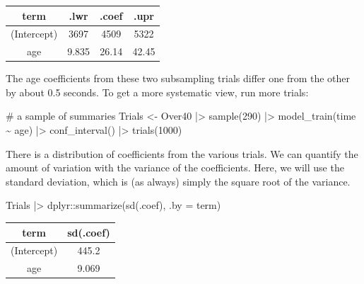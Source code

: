 \documentclass[
  letterpaper,
  DIV=11,
  numbers=noendperiod,
  oneside]{scrartcl}
\newenvironment{Shaded}{\begin{snugshade}}{\end{snugshade}}
\newcommand{\AttributeTok}[1]{\textcolor[rgb]{0.40,0.45,0.13}{#1}}
\newcommand{\CommentTok}[1]{\textcolor[rgb]{0.37,0.37,0.37}{#1}}
\newcommand{\DecValTok}[1]{\textcolor[rgb]{0.68,0.00,0.00}{#1}}
\newcommand{\FunctionTok}[1]{\textcolor[rgb]{0.28,0.35,0.67}{#1}}
\newcommand{\NormalTok}[1]{\textcolor[rgb]{0.00,0.23,0.31}{#1}}
\newcommand{\OtherTok}[1]{\textcolor[rgb]{0.00,0.23,0.31}{#1}}
\newcommand{\SpecialCharTok}[1]{\textcolor[rgb]{0.37,0.37,0.37}{#1}}
\begin{document}
\begin{longtable}[]{@{}cccc@{}}
\toprule\noalign{}
term & .lwr & .coef & .upr \\
\midrule\noalign{}
\endhead
\bottomrule\noalign{}
\endlastfoot
(Intercept) & 3697 & 4509 & 5322 \\
age & 9.835 & 26.14 & 42.45 \\
\end{longtable}

The age coefficients from these two subsampling trials differ one from
the other by about 0.5 seconds. To get a more systematic view, run more
trials:

\begin{Shaded}
\begin{Highlighting}[]
\CommentTok{\# a sample of summaries}
\NormalTok{Trials }\OtherTok{\textless{}{-}} 
\NormalTok{  Over40 }\SpecialCharTok{|\textgreater{}} \FunctionTok{sample}\NormalTok{(}\DecValTok{290}\NormalTok{) }\SpecialCharTok{|\textgreater{}}
  \FunctionTok{model\_train}\NormalTok{(time }\SpecialCharTok{\textasciitilde{}}\NormalTok{ age) }\SpecialCharTok{|\textgreater{}}
  \FunctionTok{conf\_interval}\NormalTok{() }\SpecialCharTok{|\textgreater{}}
  \FunctionTok{trials}\NormalTok{(}\DecValTok{1000}\NormalTok{)}
\end{Highlighting}
\end{Shaded}

There is a distribution of coefficients from the various trials. We can
quantify the amount of variation with the variance of the coefficients.
Here, we will use the standard deviation, which is (as always) simply
the square root of the variance.

\begin{Shaded}
\begin{Highlighting}[]
\NormalTok{Trials }\SpecialCharTok{|\textgreater{}} 
\NormalTok{  dplyr}\SpecialCharTok{::}\FunctionTok{summarize}\NormalTok{(}\FunctionTok{sd}\NormalTok{(.coef), }\AttributeTok{.by =}\NormalTok{ term)}
\end{Highlighting}
\end{Shaded}

\begin{longtable}[]{@{}cc@{}}
\toprule\noalign{}
term & sd(.coef) \\
\midrule\noalign{}
\endhead
\bottomrule\noalign{}
\endlastfoot
(Intercept) & 445.2 \\
age & 9.069 \\
\end{longtable}
\end{document}
